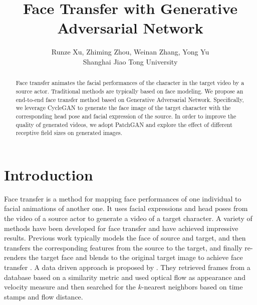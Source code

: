 \documentclass[letterpaper]{article} %
\newcommand{\weinan}[1]{{\bf \color{red} [Weinan says: #1]}}
\begin{document}
	
	\title{Face Transfer with Generative Adversarial Network}
	\author{
		Runze Xu, Zhiming Zhou, Weinan Zhang, Yong Yu\\
		Shanghai Jiao Tong University%
	}
	\maketitle
	\begin{abstract}
		Face transfer animates the facial performances of the character in the target video by a source actor. Traditional methods are typically based on face modeling. We propose an end-to-end face transfer method based on Generative Adversarial Network. Specifically, we leverage CycleGAN to generate the face image of the target character with the corresponding head pose and facial expression of the source. In order to improve the quality of generated videos, we adopt PatchGAN and explore the effect of different receptive field sizes on generated images.
		
	\end{abstract}
	
	\section{Introduction}
	Face transfer is a method for mapping face performances of one individual to facial animations of another one. It uses facial expressions and head poses from the video of a source actor to generate a video of a target character. A variety of methods have been developed for face transfer and have achieved impressive results. Previous work typically models the face of source and target, and then transfers the corresponding features from the source to the target, and finally re-renders the target face and blends to the original target image to achieve face transfer \cite{vlasic2005face,shi2014automatic,thies2016face2face}.  A data driven approach is proposed by \cite{li2012data}. They retrieved frames from a database based on a similarity metric and used optical flow as appearance and velocity measure and then searched for the $k$-nearest neighbors based on time stamps and flow distance. %
	
\end{document}
